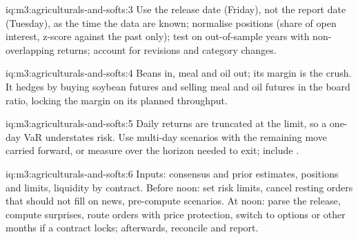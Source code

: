 \begin{solution}{iq:m3:agriculturals-and-softs:3}
Use the release date (Friday), not the report date (Tuesday), as the time the data are known; normalise
positions (share of open interest, z-score against the past only); test on out-of-sample years with
non-overlapping returns; account for revisions and category changes.
\end{solution}

\begin{solution}{iq:m3:agriculturals-and-softs:4}
Beans in, meal and oil out; its margin is the crush. It hedges by buying soybean futures and selling meal
and oil futures in the board ratio, locking the margin on its planned throughput.
\end{solution}

\begin{solution}{iq:m3:agriculturals-and-softs:5}
Daily returns are truncated at the limit, so a one-day VaR understates risk. Use multi-day scenarios with
the remaining move carried forward, or measure over the horizon needed to exit; include .
\end{solution}

\begin{solution}{iq:m3:agriculturals-and-softs:6}
Inputs: consensus and prior estimates, positions and limits, liquidity by contract. Before noon: set risk
limits, cancel resting orders that should not fill on news, pre-compute scenarios. At noon: parse the
release, compute surprises, route orders with price protection, switch to options or other months if a
contract locks; afterwards, reconcile and report.
\end{solution}
